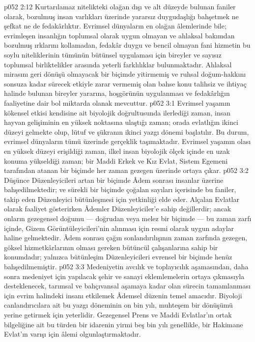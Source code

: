 \vs p052 2:12 Kurtarılamaz nitelikteki olağan dışı ve alt düzeyde bulunan faniler olarak, bozulmuş insan varlıkları üzerinde yararsız duygudaşlığı bahşetmek ne şefkat ne de fedakârlıktır. Evrimsel dünyaların en olağan âlemlerinde bile; evrimleşen insanlığın toplumsal olarak uygun olmayan ve ahlaksal bakımdan bozulmuş ırklarını kollamadan, fedakâr duygu ve bencil olmayan fani hizmetin bu soylu niteliklerinin tümünün bütünsel uygulaması için bireyler ve sayısız toplumsal birliktelikler arasında yeterli farklılıklar bulunmaktadır. Ahlaksal mirasını geri dönüşü olmayacak bir biçimde yitirmemiş ve ruhsal doğum\hyp{}hakkını sonsuza kadar sürecek etkiyle zarar vermemiş olan bahse konu talihsiz ve ihtiyaç halinde bulunan bireyler yararına, hoşgörünün uygulanması ve fedakârlığın faaliyetine dair bol miktarda olanak mevcuttur.
\vs p052 3:1 Evrimsel yaşamın kökensel etkisi kendisine ait biyolojik doğrultusunda ilerlediği zaman, insan hayvan gelişiminin en yüksek noktasına ulaştığı zaman; orada evlatlığın ikinci düzeyi gelmekte olup, lütuf ve şükranın ikinci yazgı dönemi başlatılır. Bu durum, evrimsel dünyaların tümü üzerinde gerçeklik taşımaktadır. Evrimsel yaşamın olası en yüksek düzeyi erişildiği zaman, ilkel insan biyolojik ölçek içinde en uzak konuma yükseldiği zaman; bir Maddi Erkek ve Kız Evlat, Sistem Egemeni tarafından atanan bir biçimde her zaman gezegen üzerinde ortaya çıkar.
\vs p052 3:2 Düşünce Düzenleyicileri artan bir biçimde Âdem sonrası insanlar üzerine bahşedilmektedir; ve sürekli bir biçimde çoğalan sayıları içerisinde bu faniler, takip eden Düzenleyici bütünleşmesi için yetkinliği elde eder. Alçalan Evlatlar olarak faaliyet gösterirken Âdemler Düzenleyiciler’e sahip değillerdir; ancak onların gezegensel doğumu --- doğrudan veya melez bir biçimde --- bu zaman zarfı içinde, Gizem Görüntüleyicileri’nin alınması için resmi olarak uygun adaylar haline gelmektedir. Âdem sonrası çağın sonlandırılışının zaman zarfında gezegen, göksel hizmetkârlarının olması gereken bütüncül çalışanlarına sahip bir konumdadır; yalnızca bütünleşim Düzenleyicileri evrensel bir biçimde henüz bahşedilmemiştir.
\vs p052 3:3 Medeniyetin avcılık ve toplayıcılık aşamasından, daha sonra medeniyet için yapılacak şehir ve sanayi eklemlemelerin ortaya çıkmasıyla desteklenecek, tarımsal ve bahçıvansal aşamaya kadar olan sürecin tamamlanması için evrim halindeki insanı etkilemek Âdemsel düzenin temel amacıdır. Biyoloji canlandırıcılara ait bu yazgı döneminin on bin yılı, muhteşem bir dönüşümü yerine getirmek için yeterlidir. Gezegensel Prens ve Maddi Evlatlar’ın ortak bilgeliğine ait bu türden bir idarenin yirmi beş bin yılı genellikle, bir Hakimane Evlat’ın varışı için âlemi olgunlaştırmaktadır.
